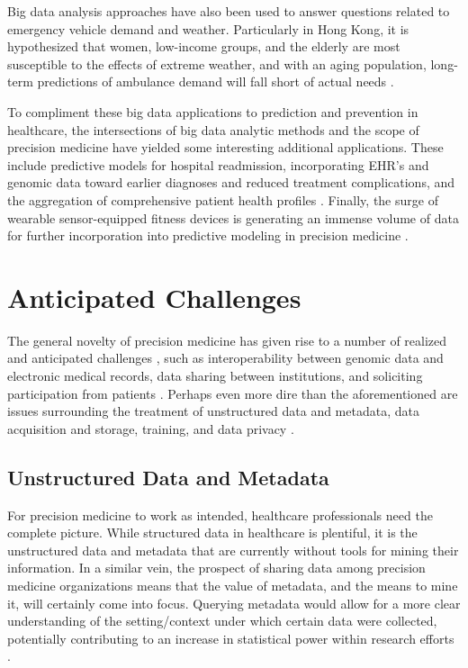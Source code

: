 Big data analysis approaches have also been used to answer questions related to emergency vehicle demand and weather. Particularly in Hong Kong, it is hypothesized that women, low-income groups, and the elderly are most susceptible to the effects of extreme weather, and with an aging population, long-term predictions of ambulance demand will fall short of actual needs \cite{Wong2015}.

To compliment these big data applications to prediction and prevention in healthcare, the intersections of big data analytic methods and the scope of precision medicine have yielded some interesting additional applications. These include predictive models for hospital readmission, incorporating EHR's and genomic data toward earlier diagnoses and reduced treatment complications, and the aggregation of comprehensive patient health profiles \cite{Leff2015}. Finally, the surge of wearable sensor-equipped fitness devices is generating an immense volume of data for further incorporation into predictive modeling in precision medicine \cite{ehealth2017}.

\section{Anticipated Challenges}

The general novelty of precision medicine has given rise to a number of realized and anticipated challenges \cite{Leff2015} \cite{He2017}, such as interoperability between genomic data and electronic medical records, data sharing between institutions, and soliciting participation from patients \cite{ehealth2017}. Perhaps even more dire than the aforementioned are issues surrounding the treatment of unstructured data and metadata, data acquisition and storage, training, and data privacy \cite{ehealth2017} \cite{He2017}.

\subsection{Unstructured Data and Metadata}

For precision medicine to work as intended, healthcare professionals need the complete picture. While structured data in healthcare is plentiful, it is the unstructured data and metadata that are currently without tools for mining their information. In a similar vein, the prospect of sharing data among precision medicine organizations means that the value of metadata, and the means to mine it, will certainly come into focus. Querying metadata would allow for a more clear understanding of the setting/context under which certain data were collected, potentially contributing to an increase in statistical power within research efforts \cite{ehealth2017}.

